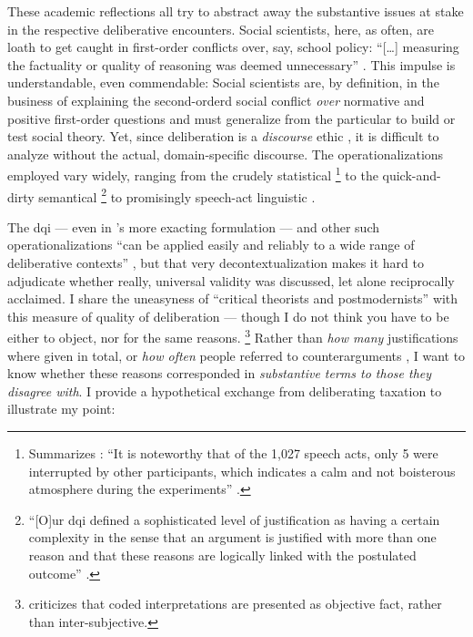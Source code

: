 These academic reflections all try to abstract away the substantive issues at stake in the respective deliberative encounters.
Social scientists, here, as often, are loath to get caught in first-order conflicts over, say, school policy:
``[\ldots] measuring the factuality or quality of reasoning was deemed unnecessary'' \cite[10]{Stromer-Galley2007}.
This impulse is understandable, even commendable:
Social scientists are, by definition, in the business of explaining the second-orderd social conflict \emph{over} normative and positive first-order questions \citep[12][compare]{GutmannThompson-2004-aa} and must generalize from the particular to build or test social theory.
Yet, since deliberation is a \emph{discourse} ethic \citep[153]{GutmannThompson-2002-aa}, it is difficult to analyze without the actual, domain-specific discourse.
The operationalizations employed vary widely, ranging from the crudely statistical \citep{Steiner2012}
\footnote{
	Summarizes \citeauthor{Steiner2012}:
	``It is noteworthy that of the 1,027 speech acts, only 5 were interrupted by other participants, which indicates a calm and not boisterous atmosphere during the experiments'' \citeyearpar[47]{Steiner2012}.
	}
to the quick-and-dirty semantical \citep{Steiner2012}
\footnote{
	``[O]ur \gls{dqi} defined a sophisticated level of justification as having a certain complexity in the sense that an argument is justified with more than one reason and that these reasons are logically linked with the postulated outcome'' \cite[64]{Steiner2012}.
}
to promisingly speech-act linguistic \citep{Landwehr2010}.

The \gls{dqi} --- even in \citeauthor{Steenbergen2003}'s more exacting formulation --- and other such operationalizations ``can be applied easily and reliably to a wide range of deliberative contexts'' \citep[22]{Steenbergen2003}, but that very decontextualization makes it hard to adjudicate whether really, universal validity was discussed, let alone reciprocally acclaimed.
I share the uneasyness of ``critical theorists and postmodernists'' \cite[11]{Steiner2012} with this measure of quality of deliberation --- though I do not think you have to be either to object, nor for the same reasons.
\footnote{
	\cite{King2009} criticizes that coded interpretations are presented as objective fact, rather than inter-subjective.
}
Rather than \emph{how many} justifications where given in total, or \emph{how often} people referred to counterarguments \cite[29]{Steenbergen2003}, I want to know whether these reasons corresponded in \emph{substantive terms to those they disagree with}.
I provide a hypothetical exchange from deliberating taxation to illustrate my point:

